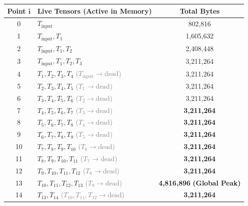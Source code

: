 \documentclass[11pt,a4paper]{article}
\begin{document}
\begin{table}[H]
\centering
\small
\begin{tabular}{clc}
\toprule
\textbf{Point $\boldsymbol{i}$} & \textbf{Live Tensors (Active in Memory)} & \textbf{Total Bytes} \\
\midrule
0  & $T_{\text{input}}$                                                                 & 802,816 \\
1  & $T_{\text{input}}, T_1$                                                             & 1,605,632 \\
2  & $T_{\text{input}}, T_1, T_2$                                                         & 2,408,448 \\
3  & $T_{\text{input}}, T_1, T_2, T_3$                                                     & 3,211,264 \\
4  & $T_1, T_2, T_3, T_4$ \quad \textcolor{gray}{\small($T_{\text{input}}\to\text{dead}$)} & 3,211,264 \\
5  & $T_2, T_3, T_4, T_5$ \quad \textcolor{gray}{\small($T_1\to\text{dead}$)}             & 3,211,264 \\
6  & $T_3, T_4, T_5, T_6$ \quad \textcolor{gray}{\small($T_2\to\text{dead}$)}             & 3,211,264 \\
7  & $T_4, T_5, T_6, T_7$ \quad \textcolor{gray}{\small($T_3\to\text{dead}$)}             & \textbf{3,211,264} \\
8  & $T_5, T_6, T_7, T_8$ \quad \textcolor{gray}{\small($T_4\to\text{dead}$)}             & \textbf{3,211,264} \\
9  & $T_6, T_7, T_8, T_9$ \quad \textcolor{gray}{\small($T_5\to\text{dead}$)}             & \textbf{3,211,264} \\
10 & $T_7, T_8, T_9, T_{10}$ \quad \textcolor{gray}{\small($T_6\to\text{dead}$)}            & \textbf{3,211,264} \\
11 & $T_8, T_9, T_{10}, T_{11}$ \quad \textcolor{gray}{\small($T_7\to\text{dead}$)}           & \textbf{3,211,264} \\
12 & $T_9, T_{10}, T_{11}, T_{12}$ \quad \textcolor{gray}{\small($T_8\to\text{dead}$)}          & \textbf{3,211,264} \\
13 & $T_{10}, T_{11}, T_{12}, T_{13}$ \quad \textcolor{gray}{\small($T_9\to\text{dead}$)}     & \textbf{4,816,896} \textbf{\textcolor{highlightred}{(Global Peak)}} \\
14 & $T_{13}, T_{14}$ \quad \textcolor{gray}{\small($T_{10}, T_{11}, T_{12}\to\text{dead}$)}    & \textbf{3,211,264} \\
\bottomrule
\end{tabular}
\end{table}
\end{document}
